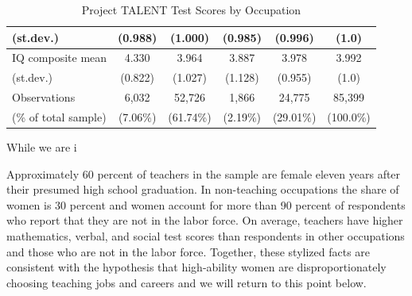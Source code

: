 \documentclass[onehalfspacing,11pt]{article}
\begin{document}
\begin{table}[h!]
\begin{tabular}{lccccc}
			\quad (st.dev.) & (0.988) & (1.000) & (0.985) & (0.996) & (1.0)\\
			\midrule
			IQ composite mean & 4.330 & 3.964 & 3.887 & 3.978 & 3.992\\
			\quad (st.dev.) & (0.822) & (1.027) & (1.128) & (0.955) & (1.0)\\
			\midrule
			Observations & 6,032 & 52,726 & 1,866 & 24,775 & 85,399\\
			\quad (\% of total sample) & (7.06\%) & (61.74\%) & (2.19\%) & (29.01\%) &(100.0\%)\\
			\bottomrule
		\end{tabular}
		\caption{Project TALENT Test Scores by Occupation}
		\label{tab:PTscores}
	\end{table}
	
	
	
	While we are i
	
	Approximately 60 percent of teachers in the sample are female eleven years after their presumed high school graduation. In non-teaching occupations the share of women is 30 percent and women account for more than 90 percent of respondents who report that they are not in the labor force. On average, teachers have higher mathematics, verbal, and social test scores than respondents in other occupations and those who are not in the labor force. Together, these stylized facts are consistent with the hypothesis that high-ability women are disproportionately choosing teaching jobs and careers and we will return to this point below.
	
\end{document}
